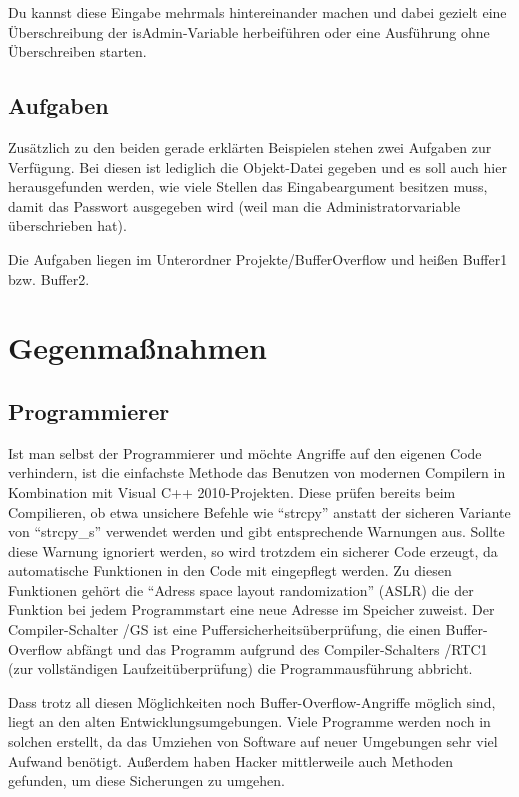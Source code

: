 Du kannst diese Eingabe mehrmals hintereinander machen und dabei gezielt eine Überschreibung der isAdmin-Variable herbeiführen oder eine Ausführung ohne Überschreiben starten.

\subsection{Aufgaben}
Zusätzlich zu den beiden gerade erklärten Beispielen stehen zwei Aufgaben zur Verfügung. Bei diesen ist lediglich die Objekt-Datei gegeben und es soll auch hier herausgefunden werden, wie viele Stellen das Eingabeargument besitzen muss, damit das Passwort ausgegeben wird (weil man die Administratorvariable überschrieben hat).

Die Aufgaben liegen im Unterordner Projekte/BufferOverflow und heißen Buffer1 bzw. Buffer2.

\section{Gegenmaßnahmen}
\subsection{Programmierer}
Ist man selbst der Programmierer und möchte Angriffe auf den eigenen Code verhindern, ist die einfachste Methode das Benutzen von modernen Compilern in Kombination mit Visual C++ 2010-Projekten. Diese prüfen bereits beim Compilieren, ob etwa unsichere Befehle wie \enquote{strcpy} anstatt der sicheren Variante von \enquote{strcpy\_s} verwendet werden und gibt entsprechende Warnungen aus. Sollte diese Warnung ignoriert werden, so wird trotzdem ein sicherer Code erzeugt, da automatische Funktionen in den Code mit eingepflegt werden. Zu diesen Funktionen gehört die \enquote{Adress space layout randomization} (ASLR) die der Funktion bei jedem Programmstart eine neue Adresse im Speicher zuweist. Der Compiler-Schalter /GS ist eine Puffersicherheitsüberprüfung, die einen Buffer-Overflow abfängt und das Programm aufgrund des Compiler-Schalters /RTC1 (zur vollständigen Laufzeitüberprüfung) die Programmausführung abbricht.

Dass trotz all diesen Möglichkeiten noch Buffer-Overflow-Angriffe möglich sind, liegt an den alten Entwicklungsumgebungen. Viele Programme werden noch in solchen erstellt, da das Umziehen von Software auf neuer Umgebungen sehr viel Aufwand benötigt. Außerdem haben Hacker mittlerweile auch Methoden gefunden, um diese Sicherungen zu umgehen.


